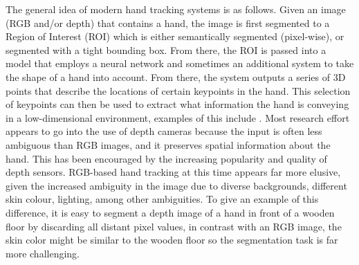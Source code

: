 
The general idea of modern hand tracking systems is as follows. Given an image (RGB and/or depth) that contains a hand, the image is first segmented to a Region of Interest (ROI) which is either semantically segmented (pixel-wise), or segmented with a tight bounding box. From there, the ROI is passed into a model that employs a neural network and sometimes an additional system to take the shape of a hand into account. From there, the system outputs a series of 3D points that describe the locations of certain  keypoints in the hand. This selection of keypoints can then be used to extract what information the hand is conveying in a low-dimensional environment, examples of this include \cite{devineau2018deep, nguyen2019skeleton, wang2019spfemd}. Most research effort appears to go into the use of depth cameras because the input is often less ambiguous than RGB images, and it preserves spatial information about the hand. This has been encouraged by the increasing popularity and quality of depth sensors. RGB-based hand tracking at this time appears far more elusive, given the increased ambiguity in the image due to diverse backgrounds, different skin colour, lighting, among other ambiguities. To give an example of this difference, it is easy to segment a depth image of a hand in front of a wooden floor by discarding all distant pixel values, in contrast with an RGB image, the skin color might be similar to the wooden floor so the segmentation task is far more challenging.

